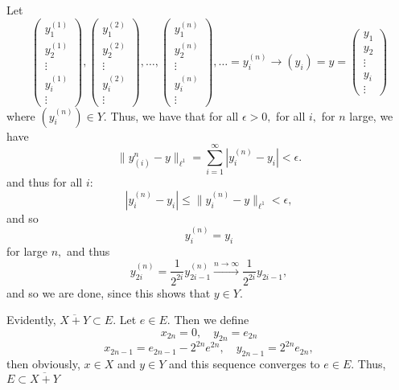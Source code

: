 \documentclass[11pt]{article}
\begin{document}
\begin{problem}
\begin{enumerate}
\begin{problem}
\begin{enumerate}
\begin{solution}
    Let \[
    \begin{pmatrix}
        y_1^{(1)}\\
        y_2^{(1)}\\
        \vdots\\
        y_i^{(1)}\\
        \vdots
    \end{pmatrix}, 
    \begin{pmatrix}
        y_1^{(2)}\\
        y_2^{(2)}\\
        \vdots\\
        y_i^{(2)}\\
        \vdots
    \end{pmatrix},
    \dots,
    \begin{pmatrix}
        y_1^{(n)}\\
        y_2^{(n)}\\
        \vdots\\
        y_i^{(n)}\\
        \vdots
    \end{pmatrix},
    \dots =
    y^{(n)}_i \to (y_i) = y = \begin{pmatrix}
        y_1\\y_2\\\vdots\\ y_i \\\vdots
    \end{pmatrix}\] where $(y^{(n)}_i) \in Y.$ Thus, we have that for all $\epsilon>0,$ for all $i,$ for $n$ large, we have
    \[\|y^{n}_{(i)} - y\|_{\ell^1} = \sum_{i=1}^\infty |y_i^{(n)} - y_i| < \epsilon.\] and thus for all $i:$
    \[|y_i^{(n)} - y_i| \leq \|y_{i}^{(n)} - y\|_{\ell^1}<\epsilon,\] and so 
    \[y_i^{(n)} = y_i\] for large $n,$ and thus
    \[y^{(n)}_{2i} = \frac{1}{2^{2i}}y^{(n)}_{2i-1}\xrightarrow{n\to \infty} \frac{1}{2^{2i}}y_{2i-1},\] and so we are done, since this shows that $y\in Y.$ 

    Evidently, $\overline{X + Y}\subset E.$ Let $e \in E.$ Then we define 
    \[x_{2n} = 0, \quad y_{2n} = e_{2n}\]
    \[x_{2n-1} =e_{2n-1} - 2^{2n}e^{2n}, \quad y_{2n-1} = 2^{2n}e_{2n},\] then obviously, $x \in X$ and $y\in Y$ and this sequence converges to $e\in E.$ Thus, $E\subset \overline{X + Y}$
    

\end{solution}
\end{enumerate}
\end{problem}
\end{enumerate}
\end{problem}
\end{document}
